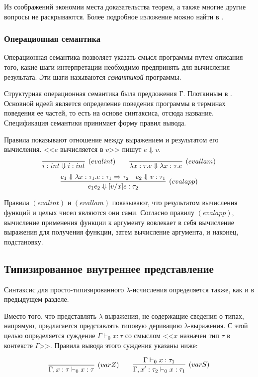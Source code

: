 Из соображений экономии места доказательства теорем, а также многие другие вопросы не раскрываются. Более подробное изложение можно найти в \cite{barendregt1992lambda}.

\subsubsection{Операционная семантика}

Операционная семантика позволяет указать смысл программы путем описания того, какие шаги интерпретации необходимо предпринять для вычисления результата. Эти шаги называются \emph{семантикой} программы.

Структурная операционная семантика была предложения Г. Плоткиным в \cite{plotkin1981structural}. Основной идеей является определение поведения программы в терминах поведения ее частей, то есть на основе синтаксиса, отсюда название. Спецификация семантики принимает форму правил вывода.

Правила показывают отношение между выражением и результатом его вычисления. <<$e$ вычисляется в $v$>> пишут $e \Downarrow v$.
$$
\infer[(evalint)]
  {i:int \Downarrow i:int}{}
\qquad
\infer[(evallam)]
  {\lambda x:\tau.e \Downarrow \lambda x:\tau.e}{}
$$
$$
\infer[(evalapp)]
  {e_1 e_2 \Downarrow [v/x]e: \tau_2}{e_1 \Downarrow \lambda x: \tau_1.e:\tau_1 \Rightarrow \tau_2 & e_2 \Downarrow v: \tau_1}
$$

Правила $(evalint)$ и $(evallam)$ показывают, что результатом вычисления функций и целых чисел являются они сами. Согласно правилу $(evalapp)$, вычисление применения функции к аргументу вовлекает в себя вычисление выражения для получения функции, затем вычисление аргумента, и наконец, подстановку.

\subsection{Типизированное внутреннее представление}

Синтаксис для просто-типизированного $\lambda$-исчисления определяется также, как и в предыдущем разделе.

Вместо того, что представлять $\lambda$-выражения, не содержащие сведения о типах, напрямую, предлагается представлять типовую деривацию $\lambda$-выражения. С этой целью определяется суждение $\Gamma \vdash_0 x:\tau$ со смыслом <<$x$ назначен тип $\tau$ в контексте $\Gamma$>>. Правила вывода этого суждения указаны ниже:

$$
\infer[(varZ)]{\Gamma, x:\tau \vdash_0 x:\tau}{}
\qquad \infer[(varS)]{\Gamma, x':\tau_2 \vdash_0 x:\tau_1}{\Gamma \vdash_0 x:\tau_1}
$$

